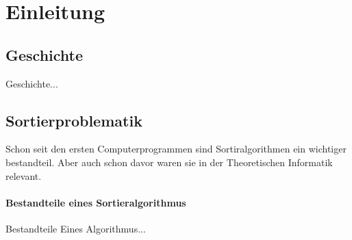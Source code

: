 \section{Einleitung}
	\subsection{Geschichte}
	Geschichte...
	
	\subsection{Sortierproblematik}
	Schon seit den ersten Computerprogrammen sind Sortiralgorithmen ein wichtiger bestandteil. Aber auch schon davor waren sie in der Theoretischen Informatik relevant.
	
	\paragraph{Bestandteile eines Sortieralgorithmus}
	Bestandteile Eines Algorithmus...
